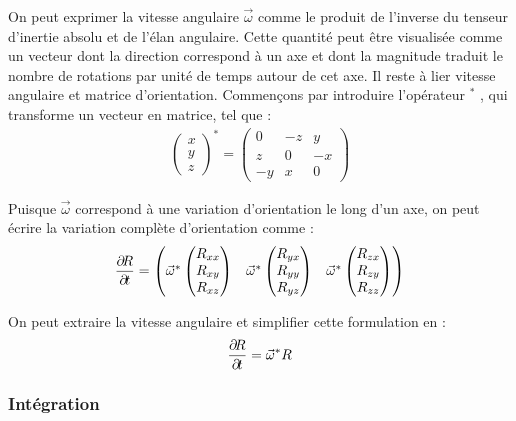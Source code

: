 On peut exprimer la vitesse angulaire $\vec{\omega}$ comme le produit
de l'inverse du tenseur d'inertie absolu et de l'élan angulaire. Cette
quantité peut être visualisée comme un vecteur dont la direction
correspond à un axe et dont la magnitude traduit le nombre de
rotations par unité de temps autour de cet axe. Il reste à lier
vitesse angulaire et matrice d'orientation. Commençons par introduire
l'opérateur $^*$ \cite{witkit}, qui transforme un vecteur en matrice,
tel que :
\begin{align*}
  \begin{pmatrix}
    x \\ y \\ z
  \end{pmatrix}
  ^*
  =
  \begin{pmatrix}
    0 & -z & y \\ z & 0 & -x \\ -y & x & 0
  \end{pmatrix}
\end{align*}

Puisque $\vec{\omega}$ correspond à une variation d'orientation le
long d'un axe, on peut écrire la variation complète d'orientation
comme :
\begin{align*}
  \frac{\partial \! R}{\partial \! t} =
  \begin{pmatrix}
    \vec{\omega}^* \begin{pmatrix} R_{xx} \\ R_{xy} \\ R_{xz} \end{pmatrix} & 
    \vec{\omega}^* \begin{pmatrix} R_{yx} \\ R_{yy} \\ R_{yz} \end{pmatrix} & 
    \vec{\omega}^* \begin{pmatrix} R_{zx} \\ R_{zy} \\ R_{zz} \end{pmatrix} \\
  \end{pmatrix}
\end{align*}

On peut extraire la vitesse angulaire et simplifier cette formulation
en :
\begin{align*}
  \frac{\partial \! R}{\partial \! t} = \vec{\omega}^*R
\end{align*}

\subsubsection{Intégration}

